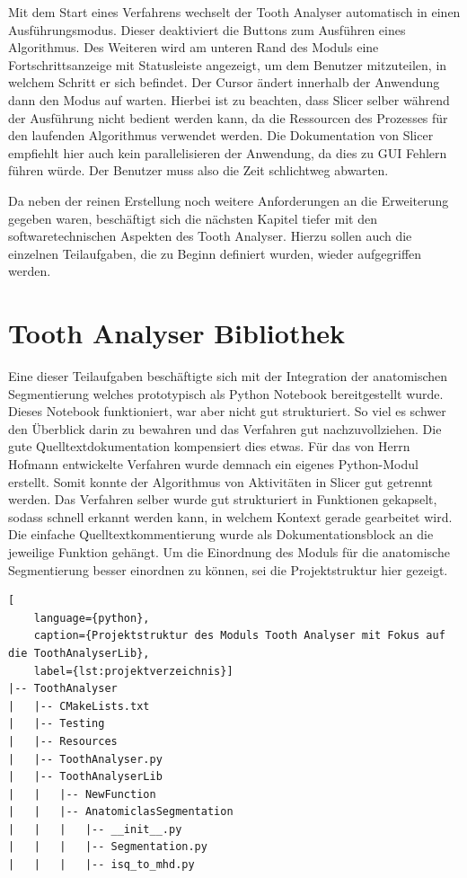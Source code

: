 Mit dem Start eines Verfahrens wechselt der Tooth Analyser automatisch in einen Ausführungsmodus.
Dieser deaktiviert die Buttons zum Ausführen eines Algorithmus. Des Weiteren wird
am unteren Rand des Moduls eine Fortschrittsanzeige mit Statusleiste angezeigt,
um dem Benutzer mitzuteilen, in welchem Schritt er sich befindet. Der Cursor
ändert innerhalb der Anwendung dann den Modus auf warten. Hierbei ist zu beachten,
dass Slicer selber während der Ausführung nicht bedient werden kann, da die Ressourcen
des Prozesses für den laufenden Algorithmus verwendet werden. Die Dokumentation
von Slicer empfiehlt hier auch kein parallelisieren der Anwendung, da dies zu \ac{GUI}
Fehlern führen würde. Der Benutzer muss also die Zeit schlichtweg abwarten.

Da neben der reinen Erstellung noch weitere Anforderungen an die Erweiterung gegeben
waren, beschäftigt sich die nächsten Kapitel tiefer mit den softwaretechnischen
Aspekten des Tooth Analyser. Hierzu sollen auch die einzelnen Teilaufgaben, die
zu Beginn definiert wurden, wieder aufgegriffen werden.

\section{Tooth Analyser Bibliothek}
Eine dieser Teilaufgaben beschäftigte sich mit der Integration der anatomischen Segmentierung
welches prototypisch als Python Notebook bereitgestellt wurde. Dieses Notebook
funktioniert, war aber nicht gut strukturiert. So viel es schwer den Überblick
darin zu bewahren und das Verfahren gut nachzuvollziehen. Die gute Quelltextdokumentation
kompensiert dies etwas. Für das von Herrn Hofmann entwickelte Verfahren wurde
demnach ein eigenes Python-Modul erstellt. Somit konnte der Algorithmus von Aktivitäten
in Slicer gut getrennt werden. Das Verfahren selber wurde gut strukturiert in
Funktionen gekapselt, sodass schnell erkannt werden kann, in welchem Kontext
gerade gearbeitet wird. Die einfache Quelltextkommentierung wurde als Dokumentationsblock
an die jeweilige Funktion gehängt. Um die Einordnung des Moduls für die
anatomische Segmentierung besser einordnen zu können, sei die Projektstruktur hier
gezeigt.

\begin{lstlisting}[
    language={python},
    caption={Projektstruktur des Moduls Tooth Analyser mit Fokus auf die ToothAnalyserLib},
    label={lst:projektverzeichnis}]
|-- ToothAnalyser
|   |-- CMakeLists.txt
|   |-- Testing
|   |-- Resources
|   |-- ToothAnalyser.py
|   |-- ToothAnalyserLib
|   |   |-- NewFunction
|   |   |-- AnatomiclasSegmentation
|   |   |   |-- __init__.py
|   |   |   |-- Segmentation.py
|   |   |   |-- isq_to_mhd.py
\end{lstlisting}

